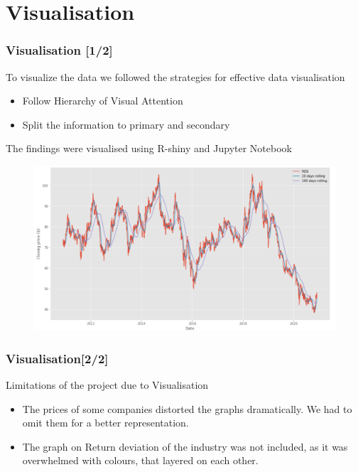 \documentclass {beamer}
\begin{document}
\section{Visualisation}
\begin{frame}
\frametitle{Visualisation [1/2]}
To visualize the data we followed the strategies for effective data visualisation
\begin{itemize}
\item Follow Hierarchy of Visual Attention
\item Split the information to primary and secondary
\end{itemize}
The findings were visualised using R-shiny and Jupyter Notebook

\begin{figure}[!h]
\includegraphics[scale=0.25]{SNP_SP}
\label{fig:snp1}
\end{figure}
\end{frame}



\begin{frame}
\frametitle{Visualisation[2/2]}
Limitations of the project due to Visualisation
\begin{itemize}
\item The prices of some companies distorted the graphs dramatically. We had to omit them for a better representation.
\item The graph on Return deviation of the industry was not included, as it was overwhelmed with colours, that layered on each other.
\end{itemize}
\end{frame}
\end{document}
